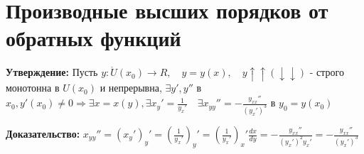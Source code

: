 \documentclass[fleqn, 12pt]{article}
\begin{document}
\section{Производные высших порядков от обратных функций}
\textbf{Утверждение:} Пусть $y : \mathring{U}(x_0) \rightarrow R, \quad y = y(x),
	\quad y \uparrow\uparrow (\downarrow\downarrow) $ - строго монотонна в $U(x_0)$ и
непрерывна, $\exists y', y''$ в
$x_0, y'(x_0) \ne 0 \Rightarrow
	\exists x = x(y), \exists x_y' = \frac{1}{y_x'} \quad
	\exists x_{yy}'' = - \frac{y_{xx}''}{(y_x')^3}$ в $y_0 = y(x_0)$

\textbf{Доказательство:}
$x_{yy}'' = (x_y')_y' = (\frac{1}{y_x'})_y' =
	(\frac{1}{y_x'})_x' \frac{dx}{dy} =
	- \frac{y_{xx}''}{(y_x')^2 y_x'} =
	- \frac{y_{xx}''}{(y_x')^3} $
\end{document}
